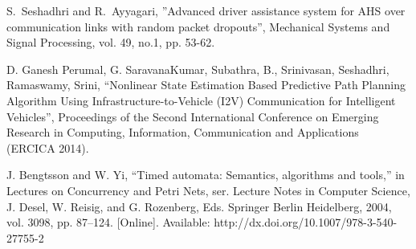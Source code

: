 \documentclass[letterpaper, 10 pt, conference]{ieeeconf}
\begin{document}
\begin{thebibliography}{1}
S.~Seshadhri and R.~Ayyagari, ''Advanced driver assistance system for AHS over communication links with random packet dropouts'', Mechanical Systems and Signal Processing, vol. 49, no.1, pp. 53-62.



D. Ganesh Perumal, G. SaravanaKumar, Subathra, B., Srinivasan, Seshadhri, Ramaswamy, Srini, ``Nonlinear State Estimation Based Predictive Path Planning Algorithm Using Infrastructure-to-Vehicle (I2V) Communication for Intelligent Vehicles'', Proceedings of the Second International Conference on Emerging Research in Computing, Information, Communication and Applications (ERCICA 2014).


J. Bengtsson and W. Yi, “Timed automata: Semantics, algorithms and
tools,” in Lectures on Concurrency and Petri Nets, ser. Lecture Notes
in Computer Science, J. Desel, W. Reisig, and G. Rozenberg, Eds.
Springer Berlin Heidelberg, 2004, vol. 3098, pp. 87–124. [Online].
Available: http://dx.doi.org/10.1007/978-3-540-27755-2















\end{thebibliography}
\end{document}
